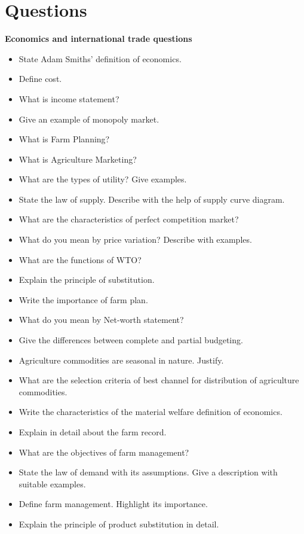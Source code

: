 \documentclass[11pt,]{book}
\providecommand{\tightlist}{%
  \setlength{\itemsep}{0pt}\setlength{\parskip}{0pt}}
\theoremstyle{definition}
\theoremstyle{definition}
\theoremstyle{definition}
\theoremstyle{remark}
\begin{document}
\part{Questions}\label{part-questions}

\textbf{Economics and international trade questions}

\begin{itemize}
\tightlist
\item
  State Adam Smiths' definition of economics.
\item
  Define cost.
\item
  What is income statement?
\item
  Give an example of monopoly market.
\item
  What is Farm Planning?
\item
  What is Agriculture Marketing?
\item
  What are the types of utility? Give examples.
\item
  State the law of supply. Describe with the help of supply curve
  diagram.
\item
  What are the characteristics of perfect competition market?
\item
  What do you mean by price variation? Describe with examples.
\item
  What are the functions of WTO?
\item
  Explain the principle of substitution.
\item
  Write the importance of farm plan.
\item
  What do you mean by Net-worth statement?
\item
  Give the differences between complete and partial budgeting.
\item
  Agriculture commodities are seasonal in nature. Justify.
\item
  What are the selection criteria of best channel for distribution of
  agriculture commodities.
\item
  Write the characteristics of the material welfare definition of
  economics.
\item
  Explain in detail about the farm record.
\item
  What are the objectives of farm management?
\item
  State the law of demand with its assumptions. Give a description with
  suitable examples.
\item
  Define farm management. Highlight its importance.
\item
  Explain the principle of product substitution in detail.

\end{itemize}
\end{document}
